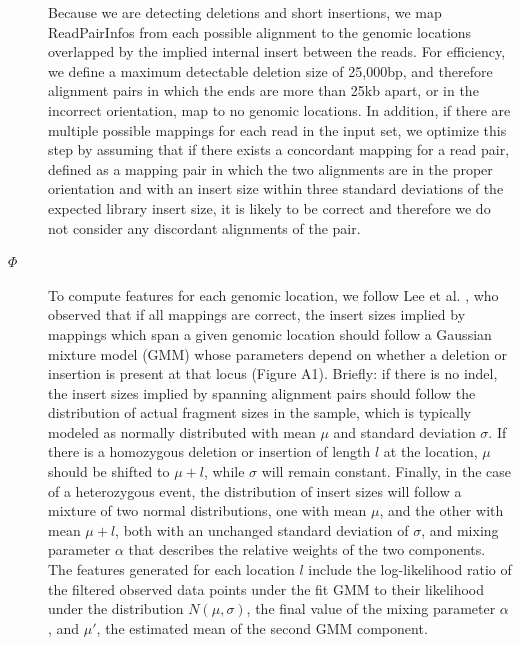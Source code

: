 \begin{description}
\item[] Because we are detecting deletions and short insertions, we map ReadPairInfos from each possible alignment to the genomic locations overlapped by the implied internal insert between the reads. For efficiency, we define a maximum detectable deletion size of 25,000bp, and therefore alignment pairs in which the ends are more than 25kb apart, or in the incorrect orientation, map to no genomic locations. In addition, if there are multiple possible mappings for each read in the input set, we optimize this step by assuming that if there exists a concordant mapping for a read pair, defined as a mapping pair in which the two alignments are in the proper orientation and with an insert size within three standard deviations of the expected library insert size, it is likely to be correct and therefore we do not consider any discordant alignments of the pair.

\item[$\Phi$] To compute features for each genomic location, we follow Lee et al. \cite{Lee:2009da}, who observed that if all mappings are correct, the insert sizes implied by mappings which span a given genomic location should follow a Gaussian mixture model (GMM) whose parameters depend on whether a deletion or insertion is present at that locus (Figure A1). Briefly: if there is no indel, the insert sizes implied by spanning alignment pairs should follow the distribution of actual fragment sizes in the sample, which is typically modeled as normally distributed with mean $\mu$ and standard deviation $\sigma$. If there is a homozygous deletion or insertion of length $l$ at the location, $\mu$ should be shifted to $\mu + l$, while $\sigma$ will remain constant. Finally, in the case of a heterozygous event, the distribution of insert sizes will follow a mixture of two normal distributions, one with mean $\mu$, and the other with mean $\mu + l$, both with an unchanged standard deviation of $\sigma$, and mixing parameter $\alpha$ that describes the relative weights of the two components. The features generated for each location $l$ include the log-likelihood ratio of the filtered observed data points under the fit GMM to their likelihood under the distribution $N(\mu,\sigma)$, the final value of the mixing parameter $\alpha$, and $\mu'$, the estimated mean of the second GMM component. 


\end{description}
